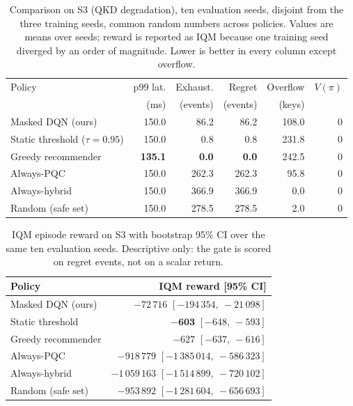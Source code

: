 

\begin{table}[t]
\caption{Comparison on S3 (QKD degradation), ten evaluation seeds,
disjoint from the three training seeds, common random numbers across
policies. Values are means over seeds; reward is reported as IQM
because one training seed diverged by an order of magnitude.
Lower is better in every column except overflow.}
\label{tab:s3}
\centering
\begin{tabular}{lrrrrr}
\hline
Policy & p99 lat. & Exhaust. & Regret & Overflow & $V(\pi)$ \\
       & (ms)     & (events) & (events) & (keys) &        \\
\hline
Masked DQN (ours)        & 150.0 & 86.2  & 86.2  & 108.0 & 0 \\
Static threshold ($\tau{=}0.95$) & 150.0 & 0.8   & 0.8   & 231.8 & 0 \\
Greedy recommender       & \textbf{135.1} & \textbf{0.0} & \textbf{0.0} & 242.5 & 0 \\
Always-PQC               & 150.0 & 262.3 & 262.3 & 95.8  & 0 \\
Always-hybrid            & 150.0 & 366.9 & 366.9 & 0.0   & 0 \\
Random (safe set)        & 150.0 & 278.5 & 278.5 & 2.0   & 0 \\
\hline
\end{tabular}
\end{table}

\begin{table}[t]
\caption{IQM episode reward on S3 with bootstrap 95\% CI over the same
ten evaluation seeds. Descriptive only: the gate is scored on regret
events, not on a scalar return.}
\label{tab:s3reward}
\centering
\begin{tabular}{lr}
\hline
Policy & IQM reward [95\% CI] \\
\hline
Masked DQN (ours)        & $-72\,716$ $[-194\,354,\ -21\,098]$ \\
Static threshold         & $\mathbf{-603}$ $[-648,\ -593]$ \\
Greedy recommender       & $-627$ $[-637,\ -616]$ \\
Always-PQC               & $-918\,779$ $[-1\,385\,014,\ -586\,323]$ \\
Always-hybrid            & $-1\,059\,163$ $[-1\,514\,899,\ -720\,102]$ \\
Random (safe set)        & $-953\,892$ $[-1\,281\,604,\ -656\,693]$ \\
\hline
\end{tabular}
\end{table}

